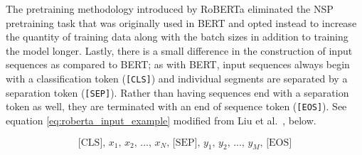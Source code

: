 \documentclass[12pt]{article}
\begin{document}
The pretraining methodology introduced by RoBERTa eliminated the NSP pretraining task that was originally used in BERT and opted instead to increase
the quantity of training data along with the batch sizes in addition to training the model longer. Lastly, there is a small difference in the
construction of input sequences as compared to BERT; as with BERT, input sequences always begin with a classification token (\lstinline|[CLS]|) and
individual segments are separated by a separation token (\lstinline|[SEP]|). Rather than having sequences end with a separation token as well, they
are terminated with an end of sequence token (\lstinline|[EOS]|). See equation \ref{eq:roberta_input_example} modified from Liu et
al.~\cite{liu_roberta_2019}, below.

\begin{equation}\label{eq:roberta_input_example}
    \mbox{[CLS], $x_1$, $x_2$, ..., $x_N$, [SEP], $y_1$, $y_2$, ..., $y_M$, [EOS]}
\end{equation}



\end{document}
